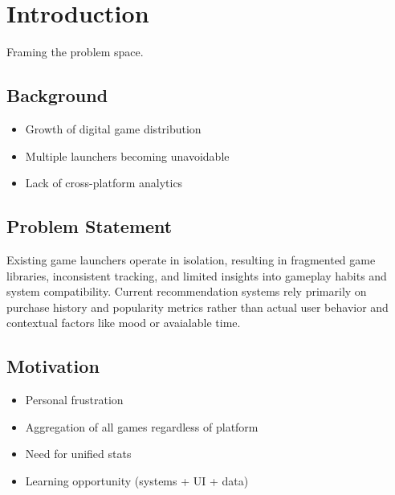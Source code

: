 \section{Introduction}
Framing the problem space.

\subsection{Background}
\begin{itemize}
  \item Growth of digital game distribution
  \item Multiple launchers becoming unavoidable
  \item Lack of cross-platform analytics
\end{itemize}

\subsection{Problem Statement}
Existing game launchers operate in isolation, resulting in fragmented game libraries, inconsistent tracking, and limited insights into gameplay habits and system compatibility. Current recommendation systems rely primarily on purchase history and popularity metrics rather than actual user behavior and contextual factors like mood or avaialable time.

\subsection{Motivation}
\begin{itemize}
  \item Personal frustration
  \item Aggregation of all games regardless of platform
  \item Need for unified stats
  \item Learning opportunity (systems + UI + data)
\end{itemize}
